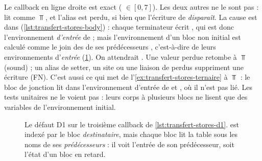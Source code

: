 Le callback en ligne droite est exact ( $\in [0,7]$). Les deux
autres ne le sont pas :  lit  comme $\Top$, et l'alias
 est perdu, si bien que l'écriture de  \emph{disparaît}. La
cause est dans  (\cref{lst:transfert-stores-body}) :
chaque terminateur écrit , qui est donc
l'environnement \emph{d'entrée} de  ; mais l'environnement d'un
bloc non initial est calculé comme le join des  de ses
prédécesseurs , c'est-à-dire de leurs environnements d'\emph{entrée}
(\cref{fig:transfert-stores-d1}). On attendrait
. Une valeur perdue retombe à $\Top$ (sound) ; un
alias de setter, un site ou une liaison de  perdus
suppriment une écriture (FN). C'est aussi ce qui met 
de l'\cref{ex:transfert-stores-ternaire} à $\Top$ : le bloc de jonction lit
 dans l'environnement d'entrée de  et , où il
n'est pas lié. Les tests unitaires ne le voient pas : leurs corps à
plusieurs blocs ne lisent que des variables de l'environnement initial.

\begin{figure}[htbp]\centering
{}
\caption{Le défaut D1 sur le troisième callback de \cref{lst:transfert-stores-d1}.
 est indexé par le bloc \emph{destinataire}, mais chaque bloc
lit la table sous les noms de ses \emph{prédécesseurs} : il voit l'entrée de
son prédécesseur, soit l'état \og d'un bloc en retard\fg{}.}
\label{fig:transfert-stores-d1}
\end{figure}

